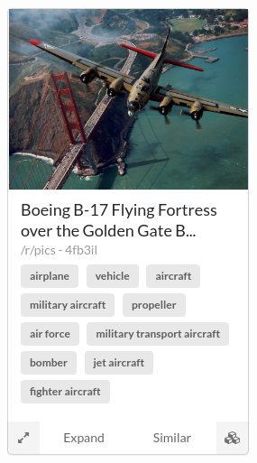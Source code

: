 \documentclass[msc,oneside]{ubcthesis}%
\begin{document}
\begin{figure}[H]
\begin{multicols}{2}
    \includegraphics[width=\linewidth]{card.png}\par 

\end{multicols}
\end{figure}
\end{document}
